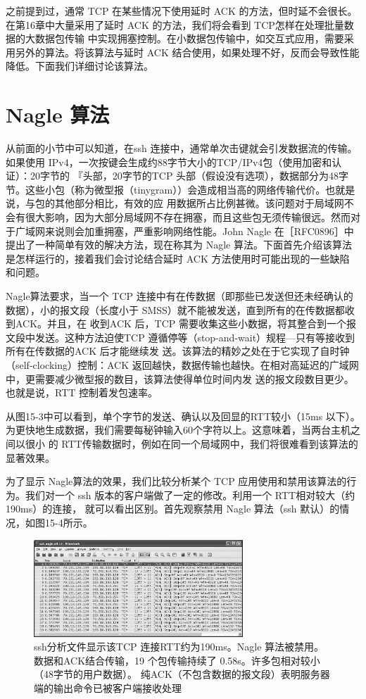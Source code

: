 之前提到过，通常 TCP 在某些情况下使用延时 ACK 的方法，但时延不会很长。在第16章中大量采用了延时 ACK 的方法，我们将会看到 TCP怎样在处理批量数据的大数据包传输
中实现拥塞控制。在小数据包传输中，如交互式应用，需要采用另外的算法。将该算法与延时 ACK 结合使用，如果处理不好，反而会导致性能降低。下面我们详细讨论该算法。

\section{Nagle 算法}
从前面的小节中可以知道，在ssh 连接中，通常单次击键就会引发数据流的传输。如果使用 IPv4，一次按键会生成约88字节大小的TCP/IPv4包（使用加密和认证）：20字节的
『头部，20字节的TCP 头部（假设没有选项），数据部分为48字节。这些小包（称为微型报（tinygram））会造成相当高的网络传输代价。也就是说，与包的其他部分相比，有效的应
用数据所占比例甚微。该问题对于局域网不会有很大影响，因为大部分局域网不存在拥塞，而且这些包无须传输很远。然而对于广域网来说则会加重拥塞，严重影响网络性能。John
Nagle 在［RFC0896］中提出了一种简单有效的解决方法，现在称其为 Nagle 算法。下面首先介绍该算法是怎样运行的，接着我们会讨论结合延时 ACK 方法使用时可能出现的一些缺陷
和问题。

Nagle算法要求，当一个 TCP 连接中有在传数据（即那些已发送但还未经确认的数据），小的报文段（长度小于 SMSS）就不能被发送，直到所有的在传数据都收到ACK。并且，在
收到ACK 后，TCP 需要收集这些小数据，将其整合到一个报文段中发送。这种方法迫使TCP 遵循停等（stop-and-wait）规程—只有等接收到所有在传数据的ACK 后才能继续发
送。该算法的精妙之处在于它实现了自时钟（self-clocking）控制：ACK 返回越快，数据传输也越快。在相对高延迟的广域网中，更需要减少微型报的数目，该算法使得单位时间内发
送的报文段数目更少。也就是说，RTT 控制着发包速率。

从图15-3中可以看到，单个字节的发送、确认以及回显的RTT较小（15ms 以下）。为更快地生成数据，我们需要每秘钟输入60个字符以上。这意味着，当两台主机之间以很小
的 RTT传输数据时，例如在同一个局域网中，我们将很难看到该算法的显著效果。

为了显示 Nagle算法的效果，我们比较分析某个 TCP 应用使用和禁用该算法的行为。我们对一个 ssh 版本的客户端做了一定的修改。利用一个 RTT相对较大（约190ms）的连接，
就可以看出区别。首先观察禁用 Nagle 算法（ssh 默认）的情况，如图15-4所示。
\begin{figure}[!htb]
    \centering
	\includegraphics[width=0.7\textwidth]{imgs/15/15-4.png}
	\caption{ssh分析文件显示该TCP 连接RTT约为190ms。Nagle 算法被禁用。数据和ACK结合传输，19 个包传输持续了 0.58s。许多包相对较小（48字节的用户数据）。
    纯ACK（不包含数据的报文段）表明服务器端的输出命令已被客户端接收处理}
\end{figure}


